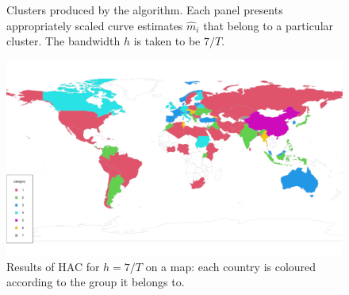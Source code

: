 \documentclass[a4paper,12pt]{article}
\numberwithin{equation}{section}
\begin{document}
\begin{figure}
\ContinuedFloat
\centering
\begin{subfigure}[b]{0.48\textwidth}
\end{subfigure}
\caption{Clusters produced by the algorithm. Each panel presents appropriately scaled curve estimates $\hat{m}_i$ that belong to a particular cluster. The bandwidth $h$ is taken to be $7/T$.}\label{fig:clusters}
\end{figure}

\begin{figure}[t!]
\begin{minipage}[t]{0.98\textwidth}
\includegraphics[width=\textwidth]{plots/14days/choropleth}
\caption{Results of HAC for $h = 7/T$ on a map: each country is coloured according to the group it belongs to.}\label{fig:map_14days}
\end{minipage}
\end{figure}



\clearpage

{\small
\setlength{\bibsep}{0.35em}
}
\end{document}
